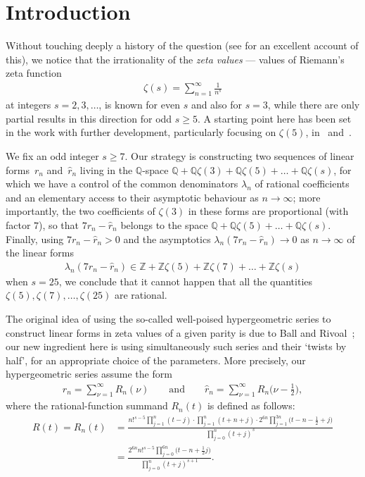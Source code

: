 \documentclass[11pt]{article}
\begin{document}
\section{Introduction}\label{s1}

Without touching deeply a history of the question (see \cite{Fi04} for an excellent account of this), we notice that the irrationality of the \emph{zeta values} --- values of Riemann's zeta function
\begin{gather*}
\zeta(s)=\sum_{n=1}^\infty\frac1{n^s}
\end{gather*}
at integers $s=2,3,\dots$, is known for even $s$ and also for $s=3$, while there are only partial results in this direction for odd $s\ge5$.
A starting point here has been set in the work \cite{BR01} with further development, particularly focusing on $\zeta(5)$, in~\cite{Ri02} and~\cite{Zu04}.

We fix an odd integer $s\ge7$. Our strategy is constructing two sequences of linear forms~$r_n$ and~$\hat r_n$ living in the $\mathbb Q$-space $\mathbb Q+\mathbb Q\zeta(3)+\mathbb Q\zeta(5)+\dots+\mathbb Q\zeta(s)$, for which we have a control of the common denominators $\lambda_n$ of rational coefficients and an elementary access to their asymptotic behaviour as $n\to\infty$; more importantly, the two coefficients of $\zeta(3)$ in these forms are proportional (with factor $7$), so that $7r_n-\hat r_n$ belongs to the space $\mathbb Q+\mathbb Q\zeta(5)+\dots+\mathbb Q\zeta(s)$. Finally, using $7r_n-\hat r_n>0$ and the asymptotics $\lambda_n(7r_n-\hat r_n)\to0$ as $n\to\infty$ of the linear forms
\begin{gather*}
\lambda_n(7r_n-\hat r_n)\in\mathbb Z+\mathbb Z\zeta(5)+\mathbb Z\zeta(7)+\dots+\mathbb Z\zeta(s)
\end{gather*}
when $s=25$, we conclude that it cannot happen that all the quantities $\zeta(5),\zeta(7),\dots,\allowbreak\zeta(25)$ are rational.

The original idea of using the so-called well-poised hypergeometric series to construct linear forms in zeta values of a given parity is due
to Ball and Rivoal~\cite{BR01}; our new ingredient here is using simultaneously such series and their `twists by half', for an appropriate choice of the parameters. More precisely, our hypergeometric series assume the form
\begin{gather}
r_n=\sum_{\nu=1}^\infty R_n(\nu) \qquad\text{and}\qquad \hat r_n=\sum_{\nu=1}^\infty R_n\big(\nu-\tfrac12\big),
\label{e01}
\end{gather}
where the rational-function summand $R_n(t)$ is defined as follows:
\begin{align}
R(t)=R_n(t)
&=\frac{n!^{s-5}\prod_{j=1}^n(t-j)\cdot\prod_{j=1}^n(t+n+j)\cdot2^{6n}\prod_{j=1}^{3n}\big(t-n-\frac12+j\big)} {\prod_{j=0}^n(t+j)^s}\nonumber\\
&=\frac{2^{6n}n!^{s-5}\prod_{j=0}^{6n}\big(t-n+\frac12j\big)}{\prod_{j=0}^n(t+j)^{s+1}}.\label{e02}
\end{align}
\end{document}
